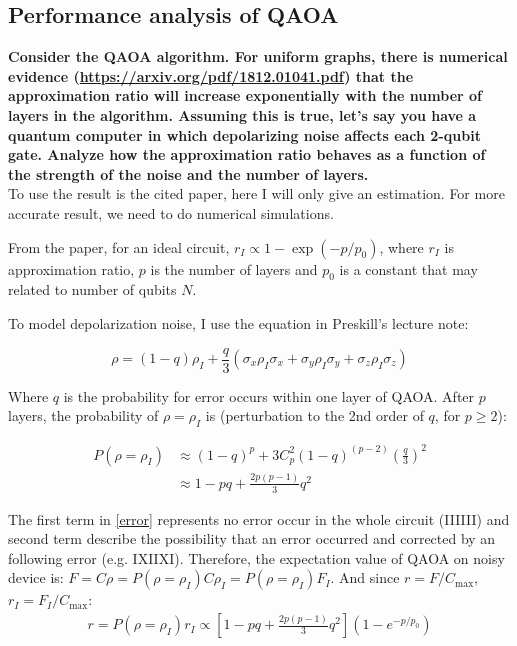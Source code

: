 \documentclass{article}
\begin{document}
\newpage
\subsection{Performance analysis of QAOA}

\textbf{Consider the QAOA algorithm. For uniform graphs, there is numerical evidence (\url{https://arxiv.org/pdf/1812.01041.pdf}) that the approximation ratio will increase exponentially with the number of layers in the algorithm. Assuming this is true, let’s say you have a quantum computer in which depolarizing noise affects each 2-qubit gate. Analyze how the approximation ratio behaves as a function of the strength of the noise and the number of layers.}\\

To use the result is the cited paper, here I will only give an estimation. For more accurate result, we need to do numerical simulations.

From the paper, for an ideal circuit, $r_I \propto 1-\exp (-p/p_0)$, where $r_I$ is approximation ratio, $p$ is the number of layers and $p_0$ is a constant that may related to number of qubits $N$.

To model depolarization noise, I use the equation in Preskill's lecture note:

\begin{equation}
    \rho = (1-q)\rho_I +\frac{q}{3} (\sigma_x\rho_I\sigma_x + \sigma_y\rho_I\sigma_y + \sigma_z\rho_I\sigma_z) 
\end{equation}

Where $q$ is the probability for error occurs within one layer of QAOA. After $p$ layers, the probability of $\rho=\rho_I$ is (perturbation to the 2nd order of $q$, for $p\geq 2$): 

\begin{align}
    \label{error}
     P(\rho=\rho_I) &\approx (1-q)^p + 3C_p^2 (1-q)^{(p-2)}(\frac{q}{3})^2\\
     &\approx 1 - pq +\frac{2p(p-1)}{3}q^2
\end{align}

The first term in \ref{error} represents no error occur in the whole circuit (IIIIII) and second term describe the possibility that an error occurred and corrected by an following error (e.g. IXIIXI). Therefore, the expectation value of QAOA on noisy device is: $F = C \rho = P(\rho=\rho_I)  C \rho_I = P(\rho=\rho_I) F_I$. And since $r = F/C_{\text{max}}$,  $r_I = F_I/C_{\text{max}}$:
\begin{align}
    r = P(\rho=\rho_I) r_I \propto  [1 - pq +\frac{2p(p-1)}{3}q^2](1-e^{-p/p_0})
    \label{res:3}
\end{align}
\end{document}
